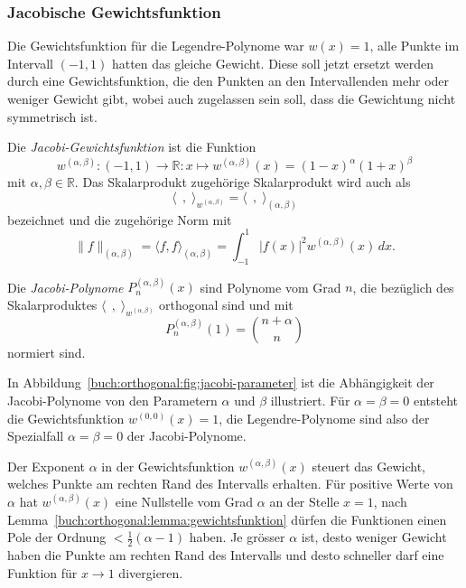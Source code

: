 %
%
\subsubsection{Jacobische Gewichtsfunktion}
Die Gewichtsfunktion für die Legendre-Polynome war $w(x)=1$, alle
Punkte im Intervall $(-1,1)$ hatten das gleiche Gewicht.
Diese soll jetzt ersetzt werden durch eine Gewichtsfunktion, die
den Punkten an den Intervallenden mehr oder weniger Gewicht gibt,
wobei auch zugelassen sein soll, dass die Gewichtung nicht symmetrisch
ist.

\begin{definition}
\label{buch:orthogonal:def:jacobi-gewichtsfunktion}
Die {\em Jacobi-Gewichtsfunktion} ist die Funktion
%
\[
w^{(\alpha,\beta)}
\colon (-1,1)\to\mathbb{R}
:
x\mapsto w^{(\alpha,\beta)}(x) = (1-x)^\alpha(1+x)^\beta
\]
mit $\alpha,\beta\in\mathbb{R}$.
Das Skalarprodukt zugehörige Skalarprodukt wird auch als
\[
\langle\,\;,\;\rangle_{w^{(\alpha,\beta)}}
=
\langle\,\;,\;\rangle_{(\alpha,\beta)}
\]
bezeichnet und die zugehörige Norm mit
\[
\|f\|_{(\alpha,\beta)}
=
\langle f,f\rangle_{(\alpha,\beta)}
=
\int_{-1}^1 |f(x)|^2 w^{(\alpha,\beta)}(x)\,dx.
\]
\end{definition}

\begin{definition}
\label{buch:orthogonal:def:jacobi-polynome}
Die {\em Jacobi-Polynome} $P^{(\alpha,\beta)}_n(x)$ sind 
%
Polynome vom Grad $n$, die bezüglich des Skalarproduktes
$\langle\,\;,\;\rangle_{w^{(\alpha,\beta)}}$ orthogonal sind
und mit
\[
P_n^{(\alpha,\beta)}(1) = \binom{n+\alpha}n
\]
normiert sind.
\end{definition}

In Abbildung~\ref{buch:orthogonal:fig:jacobi-parameter}
ist die Abhängigkeit der Jacobi-Polynome von den Parametern $\alpha$
und $\beta$ illustriert.
Für $\alpha=\beta=0$ entsteht die Gewichtsfunktion
$w^{(0,0)}(x)=1$, die Legendre-Polynome sind also der Spezialfall
$\alpha=\beta=0$ der Jacobi-Polynome.

Der Exponent $\alpha$ in der Gewichtsfunktion $w^{(\alpha,\beta)}(x)$
steuert das Gewicht, welches Punkte am rechten Rand des Intervalls
erhalten.
Für positive Werte von $\alpha$ hat $w^{(\alpha,\beta)}(x)$ eine
Nullstelle vom Grad $\alpha$ an der Stelle $x=1$, nach
Lemma~\ref{buch:orthogonal:lemma:gewichtsfunktion}
dürfen die Funktionen einen Pole der Ordnung $<\frac12(\alpha-1)$ haben.
Je grösser $\alpha$ ist, desto weniger Gewicht haben die Punkte
am rechten Rand des Intervalls und desto schneller darf eine Funktion
für $x\to 1$ divergieren.

